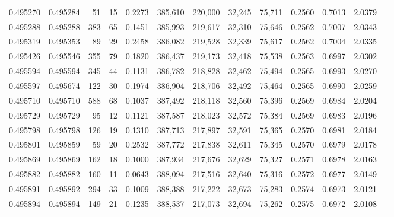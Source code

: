 \begin{tabular}{rrrrrrrrrrrrr}
0.495270 & 0.495284 &    51 &    15 &                                     0.2273 & 385,610 & 220,000 &  32,245 &  75,711 & 0.2560 & 0.7013 & 2.0379 \\
0.495288 & 0.495288 &   383 &    65 &                                     0.1451 & 385,993 & 219,617 &  32,310 &  75,646 & 0.2562 & 0.7007 & 2.0343 \\
0.495319 & 0.495353 &    89 &    29 &                                     0.2458 & 386,082 & 219,528 &  32,339 &  75,617 & 0.2562 & 0.7004 & 2.0335 \\
0.495426 & 0.495546 &   355 &    79 &                                     0.1820 & 386,437 & 219,173 &  32,418 &  75,538 & 0.2563 & 0.6997 & 2.0302 \\
0.495594 & 0.495594 &   345 &    44 &                                     0.1131 & 386,782 & 218,828 &  32,462 &  75,494 & 0.2565 & 0.6993 & 2.0270 \\
0.495597 & 0.495674 &   122 &    30 &                                     0.1974 & 386,904 & 218,706 &  32,492 &  75,464 & 0.2565 & 0.6990 & 2.0259 \\
0.495710 & 0.495710 &   588 &    68 &                                     0.1037 & 387,492 & 218,118 &  32,560 &  75,396 & 0.2569 & 0.6984 & 2.0204 \\
0.495729 & 0.495729 &    95 &    12 &                                     0.1121 & 387,587 & 218,023 &  32,572 &  75,384 & 0.2569 & 0.6983 & 2.0196 \\
0.495798 & 0.495798 &   126 &    19 &                                     0.1310 & 387,713 & 217,897 &  32,591 &  75,365 & 0.2570 & 0.6981 & 2.0184 \\
0.495801 & 0.495859 &    59 &    20 &                                     0.2532 & 387,772 & 217,838 &  32,611 &  75,345 & 0.2570 & 0.6979 & 2.0178 \\
0.495869 & 0.495869 &   162 &    18 &                                     0.1000 & 387,934 & 217,676 &  32,629 &  75,327 & 0.2571 & 0.6978 & 2.0163 \\
0.495882 & 0.495882 &   160 &    11 &                                     0.0643 & 388,094 & 217,516 &  32,640 &  75,316 & 0.2572 & 0.6977 & 2.0149 \\
0.495891 & 0.495892 &   294 &    33 &                                     0.1009 & 388,388 & 217,222 &  32,673 &  75,283 & 0.2574 & 0.6973 & 2.0121 \\
0.495894 & 0.495894 &   149 &    21 &                                     0.1235 & 388,537 & 217,073 &  32,694 &  75,262 & 0.2575 & 0.6972 & 2.0108 \\

\end{tabular}
